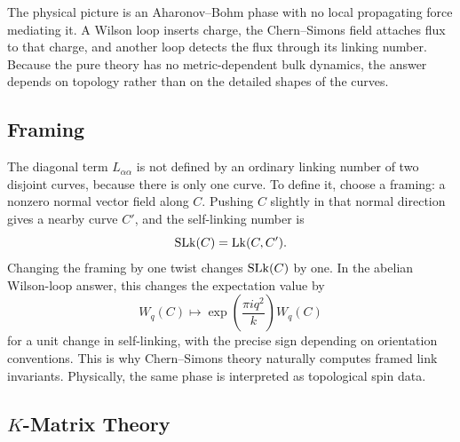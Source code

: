 The physical picture is an Aharonov--Bohm phase with no local propagating force mediating it. A Wilson loop inserts charge, the Chern--Simons field attaches flux to that charge, and another loop detects the flux through its linking number. Because the pure theory has no metric-dependent bulk dynamics, the answer depends on topology rather than on the detailed shapes of the curves.


\subsection{Framing}
\label{subsec:dense-framing}

The diagonal term $L_{\alpha\alpha}$ is not defined by an ordinary linking number of two disjoint curves, because there is only one curve. To define it, choose a framing: a nonzero normal vector field along $C$. Pushing $C$ slightly in that normal direction gives a nearby curve $C'$, and the self-linking number is
\begin{equation}
  \operatorname{SLk}(C)=\operatorname{Lk}(C,C').
  \label{eq:dense-self-linking}
\end{equation}
Changing the framing by one twist changes $\operatorname{SLk}(C)$ by one. In the abelian Wilson-loop answer, this changes the expectation value by
\begin{equation}
  W_q(C)
  \mapsto
  \exp\left(\frac{\pi i q^2}{k}\right)W_q(C)
  \label{eq:dense-framing-shift}
\end{equation}
for a unit change in self-linking, with the precise sign depending on orientation conventions. This is why Chern--Simons theory naturally computes framed link invariants. Physically, the same phase is interpreted as topological spin data.


\subsection{\texorpdfstring{$K$}{K}-Matrix Theory}
\label{subsec:dense-kmatrix-integrateout}

